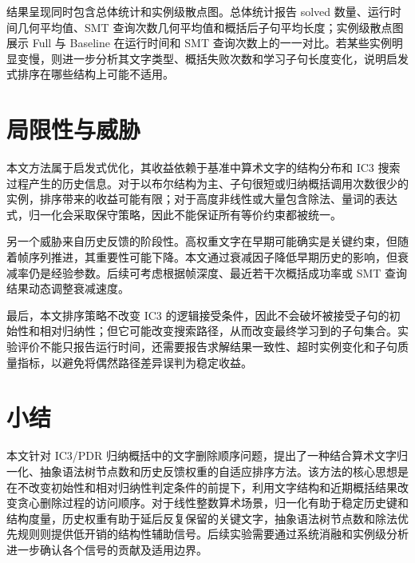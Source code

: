 \documentclass[11pt,a4paper]{article}
\begin{document}
结果呈现同时包含总体统计和实例级散点图。总体统计报告 solved 数量、运行时间几何平均值、SMT 查询次数几何平均值和概括后子句平均长度；实例级散点图展示 Full 与 Baseline 在运行时间和 SMT 查询次数上的一一对比。若某些实例明显变慢，则进一步分析其文字类型、概括失败次数和学习子句长度变化，说明启发式排序在哪些结构上可能不适用。

\section{局限性与威胁}

本文方法属于启发式优化，其收益依赖于基准中算术文字的结构分布和 IC3 搜索过程产生的历史信息。对于以布尔结构为主、子句很短或归纳概括调用次数很少的实例，排序带来的收益可能有限；对于高度非线性或大量包含除法、量词的表达式，归一化会采取保守策略，因此不能保证所有等价约束都被统一。

另一个威胁来自历史反馈的阶段性。高权重文字在早期可能确实是关键约束，但随着帧序列推进，其重要性可能下降。本文通过衰减因子降低早期历史的影响，但衰减率仍是经验参数。后续可考虑根据帧深度、最近若干次概括成功率或 SMT 查询结果动态调整衰减速度。

最后，本文排序策略不改变 IC3 的逻辑接受条件，因此不会破坏被接受子句的初始性和相对归纳性；但它可能改变搜索路径，从而改变最终学习到的子句集合。实验评价不能只报告运行时间，还需要报告求解结果一致性、超时实例变化和子句质量指标，以避免将偶然路径差异误判为稳定收益。

\section{小结}

本文针对 IC3/PDR 归纳概括中的文字删除顺序问题，提出了一种结合算术文字归一化、抽象语法树节点数和历史反馈权重的自适应排序方法。该方法的核心思想是在不改变初始性和相对归纳性判定条件的前提下，利用文字结构和近期概括结果改变贪心删除过程的访问顺序。对于线性整数算术场景，归一化有助于稳定历史键和结构度量，历史权重有助于延后反复保留的关键文字，抽象语法树节点数和除法优先规则则提供低开销的结构性辅助信号。后续实验需要通过系统消融和实例级分析进一步确认各个信号的贡献及适用边界。
\end{document}
